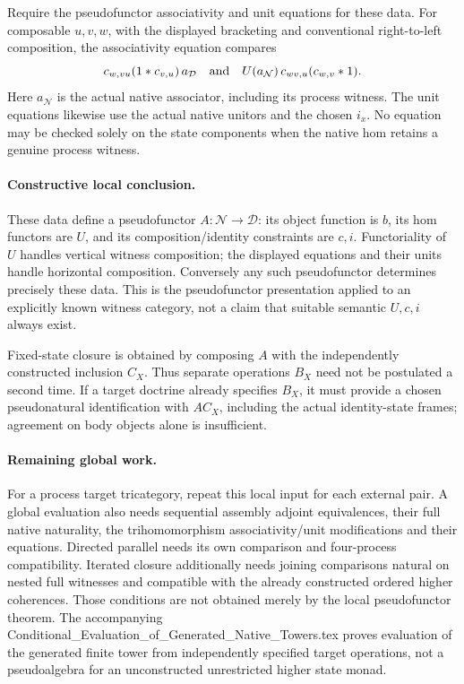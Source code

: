 \documentclass{article}
\begin{document}
Require the pseudofunctor associativity and unit equations for these data. For composable $u,v,w$, with the displayed bracketing and conventional right-to-left composition, the associativity equation compares
\[
 c_{w,vu}(1*c_{v,u})\,a_{\mathcal D}
 \quad\hbox{and}\quad
 U(a_{\mathcal N})\,c_{wv,u}(c_{w,v}*1).
\]
Here $a_{\mathcal N}$ is the actual native associator, including its process witness. The unit equations likewise use the actual native unitors and the chosen $i_x$. No equation may be checked solely on the state components when the native hom retains a genuine process witness.

\paragraph{Constructive local conclusion.} These data define a pseudofunctor $A:\mathcal N\to\mathcal D$: its object function is $b$, its hom functors are $U$, and its composition/identity constraints are $c,i$. Functoriality of $U$ handles vertical witness composition; the displayed equations and their units handle horizontal composition. Conversely any such pseudofunctor determines precisely these data. This is the pseudofunctor presentation applied to an explicitly known witness category, not a claim that suitable semantic $U,c,i$ always exist.

Fixed-state closure is obtained by composing $A$ with the independently constructed inclusion $C_X$. Thus separate operations $B_X$ need not be postulated a second time. If a target doctrine already specifies $B_X$, it must provide a chosen pseudonatural identification with $A C_X$, including the actual identity-state frames; agreement on body objects alone is insufficient.

\paragraph{Remaining global work.} For a process target tricategory, repeat this local input for each external pair. A global evaluation also needs sequential assembly adjoint equivalences, their full native naturality, the trihomomorphism associativity/unit modifications and their equations. Directed parallel needs its own comparison and four-process compatibility. Iterated closure additionally needs joining comparisons natural on nested full witnesses and compatible with the already constructed ordered higher coherences. Those conditions are not obtained merely by the local pseudofunctor theorem. The accompanying Conditional\_Evaluation\_of\_Generated\_Native\_Towers.tex proves evaluation of the generated finite tower from independently specified target operations, not a pseudoalgebra for an unconstructed unrestricted higher state monad.
\end{document}
